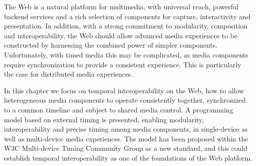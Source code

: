 The Web is a natural platform for multimedia, with universal reach, powerful
backend services and a rich selection of components for capture, interactivity
and presentation. In addition, with a strong commitment to modularity,
composition and interoperability, the Web should allow advanced media
experiences to be constructed by harnessing the combined power of simpler
components. Unfortunately, with timed media this may be complicated, as media
components require synchronization to provide a consistent experience. This is
particularly the case for distributed media experiences.

In this chapter we focus on temporal interoperability on the Web, how to allow
heterogeneous media components to operate consistently together, synchronized
to a common timeline and subject to shared media control. A programming model
based on external timing is presented, enabling modularity, interoperability
and precise timing among media components, in single-device as well as multi-device 
media experiences. The model has been proposed within the W3C Multi-device 
Timing Community Group as a new standard, and this could establish
temporal interoperability as one of the foundations of the Web platform.
